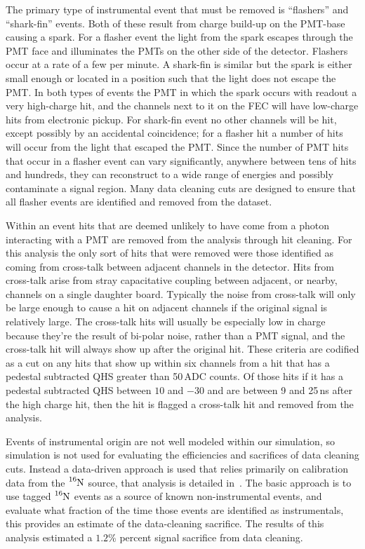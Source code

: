 The primary type of instrumental event that must be removed is ``flashers'' and
``shark-fin'' events.
Both of these result from charge build-up on the PMT-base causing a
spark.
For a flasher event the light from the spark escapes through the PMT face
and illuminates the PMTs on the other side of the detector.
Flashers occur at a rate of a few per minute.
A shark-fin is similar but the spark is either small enough or located
in a position such that the light does not escape the PMT.\@
In both types of events the PMT in which the spark occurs with readout
a very high-charge hit, and the channels next to it on the FEC will
have low-charge hits from electronic pickup.
For shark-fin event no other channels will be hit, except possibly by an
accidental coincidence; for a flasher hit a number of hits will
occur from the light that escaped the PMT.\@
Since the number of PMT hits that occur in a flasher event can vary significantly,
anywhere between tens of hits and hundreds, they can reconstruct
to a wide range of energies and possibly contaminate a signal region.
Many data cleaning cuts are designed to ensure that all
flasher events are identified and removed from the dataset.

Within an event hits that are deemed unlikely to have come from a photon interacting with a PMT
are removed from the analysis through hit cleaning.
For this analysis the only sort of hits that were removed were those identified
as coming from cross-talk between adjacent channels in the detector.
Hits from cross-talk arise from stray capacitative coupling between adjacent, or nearby, channels
on a single daughter board.
Typically the noise from cross-talk will only be large enough to cause a hit
on adjacent channels if the original signal is relatively large.
The cross-talk hits will usually be especially low in charge because they're
the result of bi-polar noise, rather than a PMT signal, and the cross-talk
hit will always show up after the original hit.
These criteria are codified as a cut on any hits that show up within
 six channels from a hit that has a pedestal subtracted QHS greater
than 50\,ADC counts. Of those hits if it has a pedestal subtracted QHS between
$10$ and $-30$ and are between 9 and 25\,ns after the high charge hit,
then the hit is flagged a cross-talk hit and removed from the analysis.

Events of instrumental origin are not well modeled within our simulation,
so simulation is not used for evaluating the efficiencies and sacrifices of
data cleaning cuts.
Instead a data-driven approach is used that relies primarily on calibration
data from the $\ce{^{16}N}$ source, that analysis is detailed in~\citep{dc_document}.%
The basic approach is to use tagged $\ce{^{16}N}$ events as a source of known
non-instrumental events, and evaluate what fraction of the time those events
are identified as instrumentals, this provides an estimate of the data-cleaning
sacrifice. The results of this analysis estimated a $1.2$\% percent signal
sacrifice from data cleaning.

